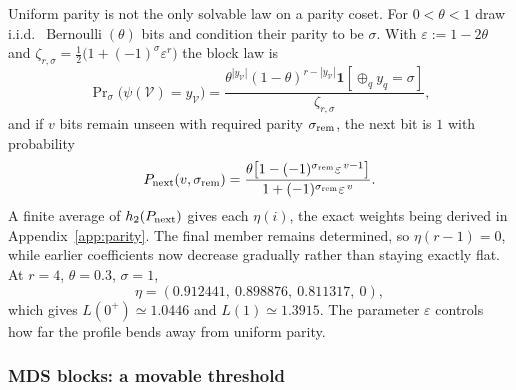 Uniform parity is not the only solvable law on a parity coset. For
$0 < \theta < 1$ draw i.i.d.\ $\operatorname{Bernoulli}(\theta)$ bits
and condition their parity to be $\sigma$. With
$\varepsilon := 1-2\theta$ and
$\zeta_{r,\sigma} = \tfrac12\big(1+(-1)^\sigma\varepsilon^r\big)$ the
block law is
%
\begin{equation}
  \Pr\nolimits_\sigma\big(\psi(\mathcal V) = y_{\mathcal V}\big)
  = \frac{\theta^{|y_{\mathcal V}|}(1-\theta)^{r-|y_{\mathcal V}|}
    \mathbf 1[\oplus_q y_q = \sigma]}{\zeta_{r,\sigma}},
  \label{eq:tiltedprior}
\end{equation}
%
and if $v$ bits remain unseen with required parity
$\sigma_{\rm rem}$, the next bit is $1$ with probability
%
\begin{equation}
  P_{\rm next}(v,\sigma_{\rm rem})
  = \frac{\theta\big[1-(-1)^{\sigma_{\rm rem}}
    \varepsilon^{\,v-1}\big]}
  {1+(-1)^{\sigma_{\rm rem}}\varepsilon^{\,v}} .
  \label{eq:tiltednext}
\end{equation}
%
A finite average of $h_2(P_{\rm next})$ gives each $\eta(i)$, the
exact weights being derived in Appendix~\ref{app:parity}. The final
member remains determined, so $\eta(r-1) = 0$, while earlier
coefficients now decrease gradually rather than staying exactly flat.
At $r = 4$, $\theta = 0.3$, $\sigma = 1$,
%
\begin{equation}
  \eta = (0.912441,\ 0.898876,\ 0.811317,\ 0),
  \label{eq:tiltedeta}
\end{equation}
%
which gives $L(0^+)\simeq1.0446$ and $L(1)\simeq1.3915$. The
parameter $\varepsilon$ controls how far the profile bends away from
uniform parity.

\subsubsection{MDS blocks: a movable threshold}

